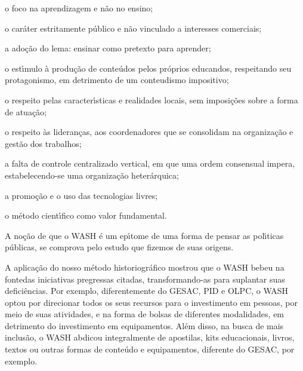 \documentclass[
12pt,		%
openright,	%
twoside,  %
a4paper,			%
chapter=TITLE,		%
english,			%
french,				%
spanish,			%
brazil				%
]{USPSC-classe/USPSC}
\begin{document}
\begin{alineas}
\item o foco na aprendizagem e n\~ao no ensino;
\item o car\'ater estritamente p\'ublico e n\~ao vinculado a interesses comerciais;
\item a ado\c{c}\~ao do lema: \textquotedbl ensinar como pretexto para aprender\textquotedbl ;
\item o est\'{\i}mulo \`a produ\c{c}\~ao de conte\'udos pelos pr\'oprios educandos, respeitando seu protagonismo, em detrimento de um \textquotedbl conteudismo impositivo\textquotedbl ;
\item o respeito pelas caracter\'{\i}sticas e realidades locais, sem imposi\c{c}\~oes sobre a forma de atua\c{c}\~ao;
\item o respeito \`as lideran\c{c}as, aos coordenadores que se consolidam na organiza\c{c}\~ao e gest\~ao dos trabalhos;
\item a falta de controle centralizado vertical, em que uma ordem consensual impera, estabelecendo-se uma organiza\c{c}\~ao heter\'arquica;
\item a promo\c{c}\~ao e o uso das tecnologias livres;
\item o m\'etodo cient\'{\i}fico como valor fundamental.
\end{alineas}

A no\c{c}\~ao de que o WASH \'e um ep\'{\i}tome de uma forma de pensar as pol\'{\i}ticas p\'ublicas, se comprova pelo estudo que fizemos de suas origens.

















A aplica\c{c}\~ao do nosso m\'etodo historiogr\'afico mostrou que o WASH \textquotedbl bebeu na fonte\textquotedbl  das iniciativas pregressas citadas, transformando-as para suplantar suas defici\^encias.  Por exemplo, diferentemente do GESAC, PID e OLPC, o WASH optou por direcionar todos os seus recursos para o investimento em pessoas, por meio de suas atividades, e na forma de bolsas de diferentes modalidades, em detrimento do investimento em equipamentos. Al\'em disso, na busca de mais inclus\~ao, o WASH abdicou integralmente de apostilas, kits educacionais, livros, textos ou outras formas de conte\'udo e equipamentos, diferente do GESAC, por exemplo.
\end{document}
